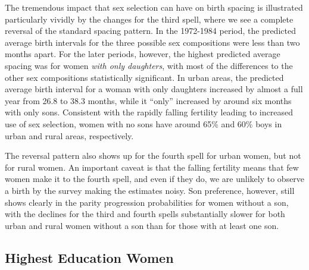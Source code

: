 \documentclass[12pt,letterpaper]{article}
\begin{document}
The tremendous impact that sex selection can have on birth spacing is illustrated 
particularly vividly by the changes for the third spell, where we see a complete reversal 
of the standard spacing pattern.
In the 1972-1984 period, the predicted average birth intervals for the three possible sex 
compositions were less than two months apart.
For the later periods, however, the highest predicted average spacing was for women
\emph{with only daughters}, with most of the differences to the other sex compositions 
statistically significant.
In urban areas, the predicted average birth interval for a woman with only daughters 
increased by almost a full year from 26.8 to 38.3 months, while it ``only'' increased
by around six months with only sons.
Consistent with the rapidly falling fertility leading to increased use of sex selection, 
women with no sons have around 65\% and 60\% boys in urban and rural areas, respectively.

The reversal pattern also shows up for the fourth spell for urban women, but not for rural 
women.
An important caveat is that the falling fertility means that few women make it to the 
fourth spell, and even if they do, we are unlikely to observe a birth by the survey making 
the estimates noisy.
Son preference, however, still shows clearly in the parity progression probabilities for 
women without a son, with the declines for the third and fourth spells substantially
slower for both urban and rural women without a son than for those with at least one son.




\subsection{Highest Education Women}
\end{document}
